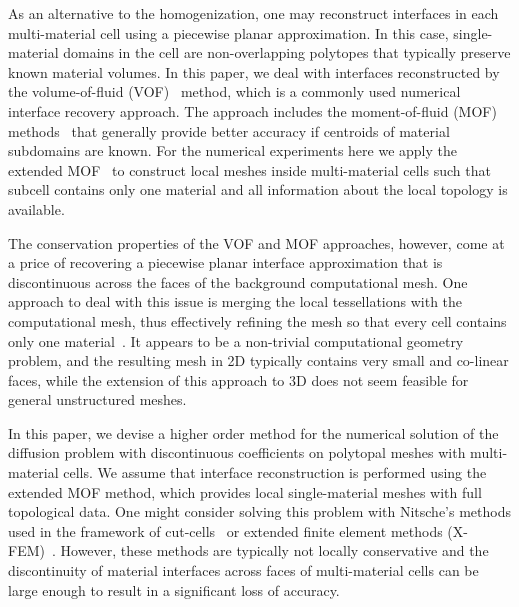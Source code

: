 \documentclass[12pt]{article}
\begin{document}
As an alternative to the homogenization, one may reconstruct interfaces in each  multi-material cell  using a piecewise planar approximation. In this case, single-material domains  in the cell are  non-overlapping polytopes that typically preserve known material volumes.
In this paper, we deal with interfaces reconstructed by the volume-of-fluid (VOF)~\cite{hirt1981volume} method, which is a commonly used numerical interface recovery approach. The approach includes the moment-of-fluid (MOF) methods~\cite{ahn2009adaptive} that generally provide better accuracy if centroids of material subdomains are known.
For the numerical experiments here we apply the extended MOF~\cite{kikinzon2018xmof}  to construct local meshes inside multi-material cells such that subcell contains only one material and all information about the local topology is available.

The conservation properties of the  VOF and MOF approaches, however, come at a price of recovering a piecewise planar interface approximation that is  discontinuous across the faces of the background computational mesh.
One approach to deal with this issue is merging the local tessellations with the computational mesh, thus effectively refining the mesh so that every cell contains only one material~\cite{garimella2011supermesh}. It appears to be a non-trivial computational geometry problem, and the resulting mesh in 2D typically contains very small and co-linear faces, while the extension of this approach to 3D does not seem feasible for general unstructured meshes.

	In this paper, we devise  a higher order method for the numerical solution of the diffusion problem with discontinuous coefficients on polytopal meshes with multi-material cells. We assume that interface reconstruction is performed using the extended MOF method, which provides local single-material meshes with full topological data. One might consider solving this problem with Nitsche’s methods used in the framework of cut-cells~\cite{burman2015cutfem, hansbo2002unfitted} or extended finite element methods (X-FEM)~\cite{dolbow2008xfem}. However, these methods are typically not locally conservative
and the discontinuity of material interfaces across faces of multi-material cells can be large enough to result in a significant loss of accuracy.
	
\end{document}
